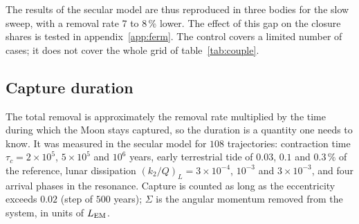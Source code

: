 \documentclass[11pt,a4paper]{article}
\newcommand{\LEM}{\ensuremath{L_{\rm EM}}}
\begin{document}
The results of the secular model are thus reproduced in three bodies for the slow sweep, with a removal rate 7 to 8\,\% lower. The effect of this gap on the closure shares is tested in appendix~\ref{app:ferm}. The control covers a limited number of cases; it does not cover the whole grid of table~\ref{tab:couple}.

\subsection{Capture duration}

The total removal is approximately the removal rate multiplied by the time during which the Moon stays captured, so the duration is a quantity one needs to know. It was measured in the secular model for $108$ trajectories: contraction time $\tau_c=2\times10^5$, $5\times10^5$ and $10^6$ years, early terrestrial tide of $0.03$, $0.1$ and $0.3\,\%$ of the reference, lunar dissipation $(k_2/Q)_L=3\times10^{-4}$, $10^{-3}$ and $3\times10^{-3}$, and four arrival phases in the resonance. Capture is counted as long as the eccentricity exceeds $0.02$ (step of $500$ years); $\Sigma$ is the angular momentum removed from the system, in units of $\LEM$.
\end{document}
